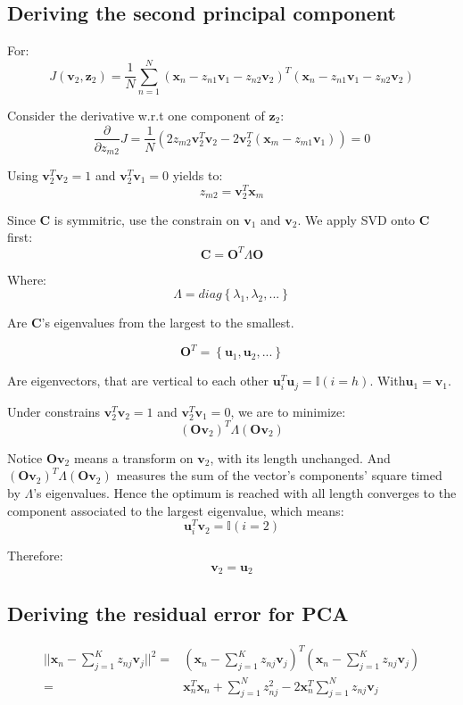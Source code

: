\documentclass[UTF8]{ctexart}
\begin{document}
\subsection{Deriving the second principal component}
For:
$$J(\textbf{v}_{2},\textbf{z}_{2})=\frac{1}{N}\sum_{n=1}^{N}(\textbf{x}_{n}-z_{n1}\textbf{v}_{1}-z_{n2}\textbf{v}_{2})^{T}(\textbf{x}_{n}-z_{n1}\textbf{v}_{1}-z_{n2}\textbf{v}_{2})$$

Consider the derivative w.r.t one component of $\textbf{z}_{2}$:
$$\frac{\partial}{\partial z_{m2}}J = \frac{1}{N}(2z_{m2}\textbf{v}_{2}^{T}\textbf{v}_{2}-2\textbf{v}_{2}^{T}(\textbf{x}_{m}-z_{m1}\textbf{v}_{1}))=0$$

Using $\textbf{v}_{2}^{T}\textbf{v}_{2}=1$ and $\textbf{v}_{2}^{T}\textbf{v}_{1}=0$ yields to:
$$z_{m2}=\textbf{v}_{2}^{T}\textbf{x}_{m}$$

Since $\textbf{C}$ is symmitric, use the constrain on $\textbf{v}_{1}$ and $\textbf{v}_{2}$. We apply SVD onto $\textbf{C}$ first:
$$\textbf{C}=\textbf{O}^{T}\Lambda\textbf{O}$$

Where:
$$\Lambda = diag\left\{ \lambda_{1},\lambda_{2},... \right\}$$

Are $\textbf{C}$'s eigenvalues from the largest to the smallest.

$$\textbf{O}^{T}=\left\{ \textbf{u}_{1},\textbf{u}_{2},... \right\}$$

Are eigenvectors, that are vertical to each other $\textbf{u}_{i}^{T}\textbf{u}_{j}=\mathbb{I}(i=h)$. With$\textbf{u}_{1}=\textbf{v}_{1}$.

Under constrains $\textbf{v}_{2}^{T}\textbf{v}_{2}=1$ and $\textbf{v}_{2}^{T}\textbf{v}_{1}=0$, we are to minimize:
$$(\textbf{O}\textbf{v}_{2})^{T}\Lambda(\textbf{O}\textbf{v}_{2})$$

Notice $\textbf{O}\textbf{v}_{2}$ means a transform on $\textbf{v}_{2}$, with its length unchanged. And $(\textbf{O}\textbf{v}_{2})^{T}\Lambda(\textbf{O}\textbf{v}_{2})$ measures the sum of the vector's components' square timed by $\Lambda$'s eigenvalues. Hence the optimum is reached with all length converges to the component associated to the largest eigenvalue, which means:
$$\textbf{u}_{i}^{T}\textbf{v}_{2} = \mathbb{I}(i=2)$$

Therefore:
$$\textbf{v}_{2}=\textbf{u}_{2}$$

\subsection{Deriving the residual error for PCA}
\begin{align}
||\textbf{x}_{n}-\sum_{j=1}^{K}z_{nj}\textbf{v}_{j}||^{2}=&(\textbf{x}_{n}-\sum_{j=1}^{K}z_{nj}\textbf{v}_{j})^{T}(\textbf{x}_{n}-\sum_{j=1}^{K}z_{nj}\textbf{v}_{j})\nonumber \\
=&\textbf{x}_{n}^{T}\textbf{x}_{n}+\sum_{j=1}^{N}z_{nj}^{2} - 2\textbf{x}_{n}^{T}\sum_{j=1}^{N}z_{nj}\textbf{v}_{j}\nonumber
\end{align}
\end{document}
